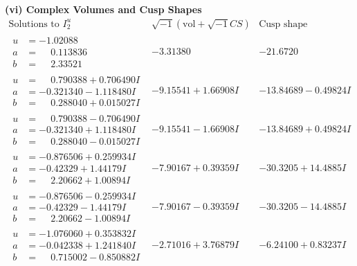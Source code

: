 \documentclass[1p]{elsarticle_modified}
\theoremstyle{definition}
\newcommand{\I}{\sqrt{-1}}
\begin{document}
\newpage\flushleft \textbf{(vi) Complex Volumes and Cusp Shapes}
$$\begin{array}{c|c|c}  
\text{Solutions to }I^u_{2}& \I (\text{vol} + \sqrt{-1}CS) & \text{Cusp shape}\\
 \hline 
\begin{aligned}
u &= -1.02088\phantom{ +0.000000I} \\
a &= \phantom{-}0.113836\phantom{ +0.000000I} \\
b &= \phantom{-}2.33521\phantom{ +0.000000I}\end{aligned}
 & -3.31380\phantom{ +0.000000I} & -21.6720\phantom{ +0.000000I} \\ \hline\begin{aligned}
u &= \phantom{-}0.790388 + 0.706490 I \\
a &= -0.321340 - 1.118480 I \\
b &= \phantom{-}0.288040 + 0.015027 I\end{aligned}
 & -9.15541 + 1.66908 I & -13.84689 - 0.49824 I \\ \hline\begin{aligned}
u &= \phantom{-}0.790388 - 0.706490 I \\
a &= -0.321340 + 1.118480 I \\
b &= \phantom{-}0.288040 - 0.015027 I\end{aligned}
 & -9.15541 - 1.66908 I & -13.84689 + 0.49824 I \\ \hline\begin{aligned}
u &= -0.876506 + 0.259934 I \\
a &= -0.42329 + 1.44179 I \\
b &= \phantom{-}2.20662 + 1.00894 I\end{aligned}
 & -7.90167 + 0.39359 I & -30.3205 + 14.4885 I \\ \hline\begin{aligned}
u &= -0.876506 - 0.259934 I \\
a &= -0.42329 - 1.44179 I \\
b &= \phantom{-}2.20662 - 1.00894 I\end{aligned}
 & -7.90167 - 0.39359 I & -30.3205 - 14.4885 I \\ \hline\begin{aligned}
u &= -1.076060 + 0.353832 I \\
a &= -0.042338 + 1.241840 I \\
b &= \phantom{-}0.715002 - 0.850882 I\end{aligned}
 & -2.71016 + 3.76879 I & -6.24100 + 0.83237 I \\ \hline\begin{aligned}

\end{aligned}
\end{array}$$
\end{document}
